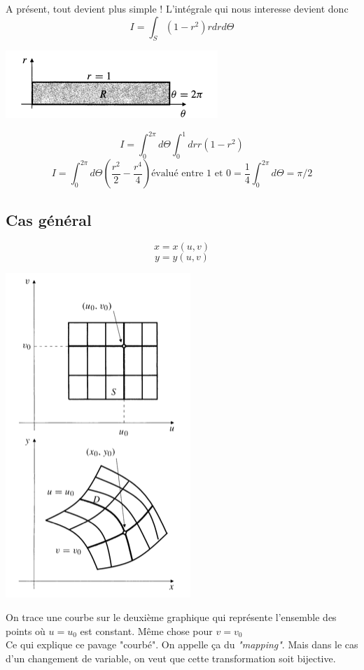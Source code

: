 A présent, tout devient plus simple ! L'intégrale qui nous interesse devient donc
 \[I=\int_S (1-r^2)r dr d\Theta\]
\begin{center}
 \includegraphics[scale=0.7]{image7.png}
\end{center}
 \[I=\int_0^{2\pi} d\Theta \int_0^1 dr r (1-r^2)\]
 \[I = \int_0^{2\pi} d \Theta \left(\frac{r^2}{2}-\frac{r^4}{4} \right) \text{évalué entre 1 et 0} = \frac{1}{4} \int_0^{2\pi} d \Theta = \pi/2 \]

\subsection{Cas général}

$$x=x(u,v)$$
$$y=y(u,v)$$
\begin{center}
\includegraphics[scale=0.5]{image8.png}
\end{center}

On trace une courbe sur le deuxième graphique qui représente l'ensemble des points où $u=u_0$ est constant. Même chose pour $v=v_0$\\
Ce qui explique ce pavage "courbé". On appelle ça du \textit{"mapping"}. Mais dans le cas d'un changement de variable, on veut que cette transformation soit bijective.\\

